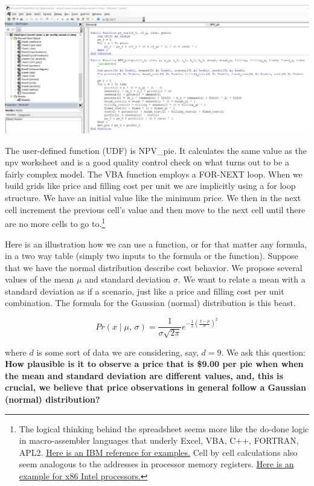 \documentclass[
]{book}
\begin{document}
\includegraphics{images/02/pie-vba-ide.jpg}

The user-defined function (UDF) is NPV\_pie. It calculates the same value as the npv worksheet and is a good quality control check on what turns out to be a fairly complex model. The VBA function employs a FOR-NEXT loop. When we build grids like price and filling cost per unit we are implicitly using a for loop structure. We have an initial value like the minimum price. We then in the next cell increment the previous cell's value and then move to the next cell until there are no more cells to go to.\footnote{The logical thinking behind the spreadsheet seems more like the do-done logic in macro-assembler languages that underly Excel, VBA, C++, FORTRAN, APL2. \href{https://www.ibm.com/support/knowledgecenter/en/SSLTBW_2.1.0/com.ibm.zos.v2r1.bpxa400/bpxug193.htm}{Here is an IBM reference for examples.} Cell by cell calculations also seem analogous to the addresses in processor memory registers. \href{https://www.cs.virginia.edu/~evans/cs216/guides/x86.html}{Here is an example for x86 Intel processors.}}

Here is an illustration how we can use a function, or for that matter any formula, in a two way table (simply two inputs to the formula or the function). Suppose that we have the normal distribution describe cost behavior. We propose several values of the mean \(\mu\) and standard deviation \(\sigma\). We want to relate a mean with a standard deviation as if a scenario, just like a price and filling cost per unit combination. The formula for the Gaussian (normal) distribution is this beast.

\[
Pr( x \mid \mu, \, \sigma) = \frac {1}{\sigma {\sqrt {2\pi }}}e^{-{\frac {1}{2}}\left({\frac {x-\mu }{\sigma }}\right)^{2}}
\]

where \(d\) is some sort of data we are considering, say, \(d = 9\). We ask this question: \textbf{How plausible is it to observe a price that is \$9.00 per pie when when the mean and standard deviation are different values, and, this is crucial, we believe that price observations in general follow a Gaussian (normal) distribution?}
\end{document}
